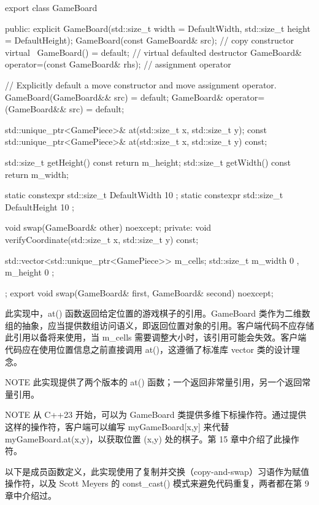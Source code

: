 \begin{cpp}
export class GameBoard
{
    public:
        explicit GameBoard(std::size_t width = DefaultWidth,
            std::size_t height = DefaultHeight);
        GameBoard(const GameBoard& src); // copy constructor
        virtual ~GameBoard() = default; // virtual defaulted destructor
        GameBoard& operator=(const GameBoard& rhs); // assignment operator

        // Explicitly default a move constructor and move assignment operator.
        GameBoard(GameBoard&& src) = default;
        GameBoard& operator=(GameBoard&& src) = default;

        std::unique_ptr<GamePiece>& at(std::size_t x, std::size_t y);
        const std::unique_ptr<GamePiece>& at(std::size_t x, std::size_t y) const;

        std::size_t getHeight() const { return m_height; }
        std::size_t getWidth() const { return m_width; }

        static constexpr std::size_t DefaultWidth { 10 };
        static constexpr std::size_t DefaultHeight { 10 };

        void swap(GameBoard& other) noexcept;
    private:
        void verifyCoordinate(std::size_t x, std::size_t y) const;

        std::vector<std::unique_ptr<GamePiece>> m_cells;
        std::size_t m_width { 0 }, m_height { 0 };
};
export void swap(GameBoard& first, GameBoard& second) noexcept;
\end{cpp}

此实现中，at() 函数返回给定位置的游戏棋子的引用。GameBoard 类作为二维数组的抽象，应当提供数组访问语义，即返回位置对象的引用。客户端代码不应存储此引用以备将来使用，当 m\_cells 需要调整大小时，该引用可能会失效。客户端代码应在使用位置信息之前直接调用 at()，这遵循了标准库 vector 类的设计理念。

\begin{myNotic}{NOTE}
此实现提供了两个版本的 at() 函数；一个返回非常量引用，另一个返回常量引用。
\end{myNotic}


\begin{myNotic}{NOTE}
从 C++23 开始，可以为 GameBoard 类提供多维下标操作符。通过提供这样的操作符，客户端可以编写 myGameBoard[x,y] 来代替 myGameBoard.at(x,y)，以获取位置 (x,y) 处的棋子。第 15 章中介绍了此操作符。
\end{myNotic}

以下是成员函数定义，此实现使用了复制并交换（copy-and-swap）习语作为赋值操作符，以及 Scott Meyers 的 const\_cast() 模式来避免代码重复，两者都在第 9 章中介绍过。

